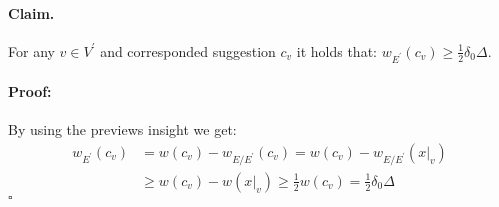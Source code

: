 \documentclass{article}
\begin{document}
\begin{multicols*}{2}
\paragraph{Claim.} For any $v \in V^\prime$ and corresponded suggestion $c_{v}$ it holds that: $w_{E^\prime}\left( c_{v} \right) \ge \frac{1}{2}\delta_{0}\Delta$. 
\paragraph{Proof:}By using the previews insight we get: \begin{equation*}
  \begin{split}
    w_{E^\prime}\left( c_{v} \right) &= w\left( c_{v} \right) - w_{E / E^\prime}\left( c_{v} \right) =  w\left( c_{v} \right) - w_{E / E^\prime}\left( x|_{v} \right) \\ 
     & \ge  w\left( c_{v} \right) - w\left( x|_{v} \right) \ge \frac{1}{2}w\left( c_{v} \right) = \frac{1}{2}\delta_{0}\Delta 
  \end{split}
\end{equation*}
$\square$


\end{multicols*}
\end{document}
